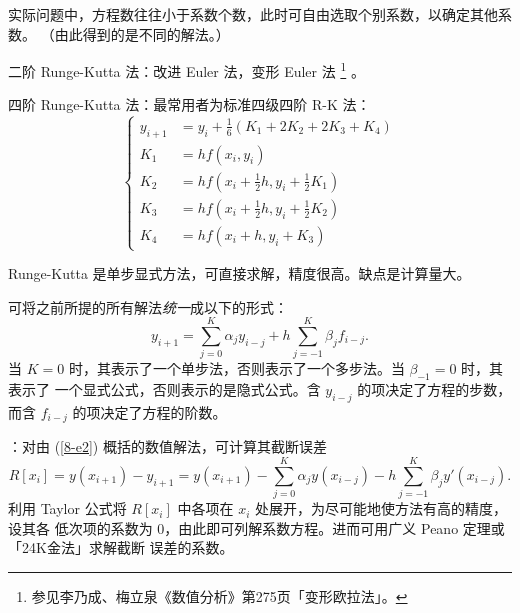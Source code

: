\entry 实际问题中，方程数往往小于系数个数，此时可自由选取个别系数，以确定其他系数。
（由此得到的是不同的解法。）

\example 二阶 Runge-Kutta 法：改进 Euler 法，变形 Euler 法
\footnote{参见李乃成、梅立泉《数值分析》第275页「变形欧拉法」。}
。

\example 四阶 Runge-Kutta 法：最常用者为标准四级四阶 R-K 法：
\begin{equation}
\begin{cases}
y_{i+1}&=y_i+\frac16(K_1+2K_2+2K_3+K_4)\\
K_1&=hf(x_i,y_i)\\
K_2&=hf\left(x_i+\frac12h,y_i+\frac12K_1\right)\\
K_3&=hf\left(x_i+\frac12h,y_i+\frac12K_2\right)\\
K_4&=hf(x_i+h,y_i+K_3)
\end{cases}
\end{equation}

\entry Runge-Kutta 是单步显式方法，可直接求解，精度很高。缺点是计算量大。

\entry 可将之前所提的所有解法\emph{统一}成以下的形式：
\begin{equation}\label{8-e2}
y_{i+1}=\sum_{j=0}^K\alpha_jy_{i-j}+h\sum_{j=-1}^K\beta_jf_{i-j}.
\end{equation}
当 $K=0$ 时，其表示了一个单步法，否则表示了一个多步法。当 $\beta_{-1}=0$ 时，其表示了
一个显式公式，否则表示的是隐式公式。含 $y_{i-j}$ 的项决定了方程的步数，而含 $f_{i-j}$
的项决定了方程的阶数。

\entry {}：对由 (\ref{8-e2}) 概括的数值解法，可计算其截断误差
\begin{equation}
R[x_i]=y(x_{i+1})-y_{i+1}=y(x_{i+1})-\sum_{j=0}^K\alpha_jy(x_{i-j})-h\sum_{j=-1}^K\beta_jy'(x_{i-j}).
\end{equation}
利用 Taylor 公式将 $R[x_i]$ 中各项在 $x_i$ 处展开，为尽可能地使方法有高的精度，设其各
低次项的系数为 $0$，由此即可列解系数方程。进而可用广义 Peano 定理或「24K金法」求解截断
误差的系数。

